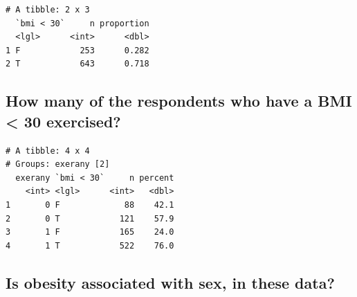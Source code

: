 \documentclass[]{book}
\newenvironment{Shaded}{\begin{snugshade}}{\end{snugshade}}
\newcommand{\KeywordTok}[1]{\textcolor[rgb]{0.13,0.29,0.53}{\textbf{#1}}}
\newcommand{\DataTypeTok}[1]{\textcolor[rgb]{0.13,0.29,0.53}{#1}}
\newcommand{\DecValTok}[1]{\textcolor[rgb]{0.00,0.00,0.81}{#1}}
\newcommand{\StringTok}[1]{\textcolor[rgb]{0.31,0.60,0.02}{#1}}
\newcommand{\OperatorTok}[1]{\textcolor[rgb]{0.81,0.36,0.00}{\textbf{#1}}}
\newcommand{\NormalTok}[1]{#1}
\theoremstyle{definition}
\theoremstyle{definition}
\theoremstyle{definition}
\theoremstyle{remark}
\begin{document}
\begin{Shaded}
\end{Shaded}

\begin{verbatim}
# A tibble: 2 x 3
  `bmi < 30`     n proportion
  <lgl>      <int>      <dbl>
1 F            253      0.282
2 T            643      0.718
\end{verbatim}

\subsection{How many of the respondents who have a BMI \textless{} 30
exercised?}\label{how-many-of-the-respondents-who-have-a-bmi-30-exercised}

\begin{Shaded}
\end{Shaded}

\begin{verbatim}
# A tibble: 4 x 4
# Groups: exerany [2]
  exerany `bmi < 30`     n percent
    <int> <lgl>      <int>   <dbl>
1       0 F             88    42.1
2       0 T            121    57.9
3       1 F            165    24.0
4       1 T            522    76.0
\end{verbatim}

\subsection{Is obesity associated with sex, in these
data?}\label{is-obesity-associated-with-sex-in-these-data}
\end{document}
